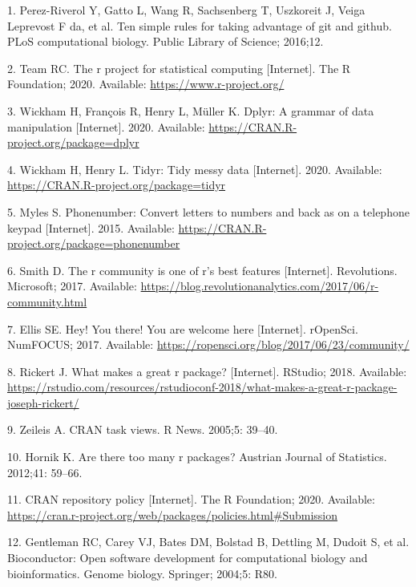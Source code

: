 \documentclass[10pt,letterpaper]{article}
\begin{document}
\hypertarget{refs}{}
\leavevmode\hypertarget{ref-perez2016}{}%
1. Perez-Riverol Y, Gatto L, Wang R, Sachsenberg T, Uszkoreit J, Veiga
Leprevost F da, et al. Ten simple rules for taking advantage of git and
github. PLoS computational biology. Public Library of Science; 2016;12.

\leavevmode\hypertarget{ref-Rproject2020}{}%
2. Team RC. The r project for statistical computing {[}Internet{]}. The
R Foundation; 2020. Available: \url{https://www.r-project.org/}

\leavevmode\hypertarget{ref-dplyr}{}%
3. Wickham H, François R, Henry L, Müller K. Dplyr: A grammar of data
manipulation {[}Internet{]}. 2020. Available:
\url{https://CRAN.R-project.org/package=dplyr}

\leavevmode\hypertarget{ref-tidyr}{}%
4. Wickham H, Henry L. Tidyr: Tidy messy data {[}Internet{]}. 2020.
Available: \url{https://CRAN.R-project.org/package=tidyr}

\leavevmode\hypertarget{ref-phonenumber}{}%
5. Myles S. Phonenumber: Convert letters to numbers and back as on a
telephone keypad {[}Internet{]}. 2015. Available:
\url{https://CRAN.R-project.org/package=phonenumber}

\leavevmode\hypertarget{ref-smith2017}{}%
6. Smith D. The r community is one of r's best features {[}Internet{]}.
Revolutions. Microsoft; 2017. Available:
\url{https://blog.revolutionanalytics.com/2017/06/r-community.html}

\leavevmode\hypertarget{ref-ellis2017}{}%
7. Ellis SE. Hey! You there! You are welcome here {[}Internet{]}.
rOpenSci. NumFOCUS; 2017. Available:
\url{https://ropensci.org/blog/2017/06/23/community/}

\leavevmode\hypertarget{ref-rickert2018}{}%
8. Rickert J. What makes a great r package? {[}Internet{]}. RStudio;
2018. Available:
\url{https://rstudio.com/resources/rstudioconf-2018/what-makes-a-great-r-package-joseph-rickert/}

\leavevmode\hypertarget{ref-zeileis2005}{}%
9. Zeileis A. CRAN task views. R News. 2005;5: 39--40.

\leavevmode\hypertarget{ref-hornik2012}{}%
10. Hornik K. Are there too many r packages? Austrian Journal of
Statistics. 2012;41: 59--66.

\leavevmode\hypertarget{ref-cranpolicy2020}{}%
11. CRAN repository policy {[}Internet{]}. The R Foundation; 2020.
Available:
\url{https://cran.r-project.org/web/packages/policies.html\#Submission}

\leavevmode\hypertarget{ref-gentleman2004}{}%
12. Gentleman RC, Carey VJ, Bates DM, Bolstad B, Dettling M, Dudoit S,
et al. Bioconductor: Open software development for computational biology
and bioinformatics. Genome biology. Springer; 2004;5: R80.
\end{document}
